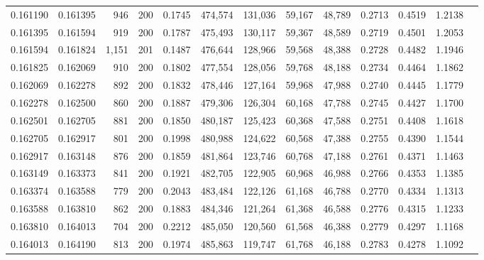 \begin{tabular}{rrrrrrrrrrrrr}
0.161190 & 0.161395 &   946 & 200 &                                     0.1745 & 474,574 & 131,036 &  59,167 &  48,789 & 0.2713 & 0.4519 & 1.2138 \\
0.161395 & 0.161594 &   919 & 200 &                                     0.1787 & 475,493 & 130,117 &  59,367 &  48,589 & 0.2719 & 0.4501 & 1.2053 \\
0.161594 & 0.161824 & 1,151 & 201 &                                     0.1487 & 476,644 & 128,966 &  59,568 &  48,388 & 0.2728 & 0.4482 & 1.1946 \\
0.161825 & 0.162069 &   910 & 200 &                                     0.1802 & 477,554 & 128,056 &  59,768 &  48,188 & 0.2734 & 0.4464 & 1.1862 \\
0.162069 & 0.162278 &   892 & 200 &                                     0.1832 & 478,446 & 127,164 &  59,968 &  47,988 & 0.2740 & 0.4445 & 1.1779 \\
0.162278 & 0.162500 &   860 & 200 &                                     0.1887 & 479,306 & 126,304 &  60,168 &  47,788 & 0.2745 & 0.4427 & 1.1700 \\
0.162501 & 0.162705 &   881 & 200 &                                     0.1850 & 480,187 & 125,423 &  60,368 &  47,588 & 0.2751 & 0.4408 & 1.1618 \\
0.162705 & 0.162917 &   801 & 200 &                                     0.1998 & 480,988 & 124,622 &  60,568 &  47,388 & 0.2755 & 0.4390 & 1.1544 \\
0.162917 & 0.163148 &   876 & 200 &                                     0.1859 & 481,864 & 123,746 &  60,768 &  47,188 & 0.2761 & 0.4371 & 1.1463 \\
0.163149 & 0.163373 &   841 & 200 &                                     0.1921 & 482,705 & 122,905 &  60,968 &  46,988 & 0.2766 & 0.4353 & 1.1385 \\
0.163374 & 0.163588 &   779 & 200 &                                     0.2043 & 483,484 & 122,126 &  61,168 &  46,788 & 0.2770 & 0.4334 & 1.1313 \\
0.163588 & 0.163810 &   862 & 200 &                                     0.1883 & 484,346 & 121,264 &  61,368 &  46,588 & 0.2776 & 0.4315 & 1.1233 \\
0.163810 & 0.164013 &   704 & 200 &                                     0.2212 & 485,050 & 120,560 &  61,568 &  46,388 & 0.2779 & 0.4297 & 1.1168 \\
0.164013 & 0.164190 &   813 & 200 &                                     0.1974 & 485,863 & 119,747 &  61,768 &  46,188 & 0.2783 & 0.4278 & 1.1092 \\

\end{tabular}
